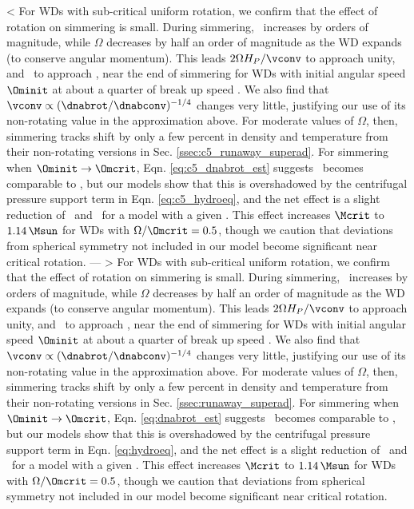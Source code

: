 < For WDs with sub-critical uniform rotation, we confirm that the effect of rotation on simmering is small.  During simmering, \vconv\ increases by orders of magnitude, while $\Omega$ decreases by half an order of magnitude as the WD expands (to conserve angular momentum).  This leads $2\Omega H_P/\vconv$ to approach unity, and \dnabrot\ to approach \dnabconv, near the end of simmering for WDs with initial angular speed $\Ominit$ at about a quarter of break up speed \Omcrit.  We also find that $\vconv \propto (\dnabrot/\dnabconv)^{-1/4}$ changes very little, justifying our use of its non-rotating value in the approximation above. For moderate values of $\Omega$, then, simmering tracks shift by only a few percent in density and temperature from their non-rotating versions in Sec. \ref{ssec:c5_runaway_superad}.  For simmering when $\Ominit \rightarrow \Omcrit$, Eqn. \ref{eq:c5_dnabrot_est} suggests \dnabrot\ becomes comparable to \nablaad, but our models show that this is overshadowed by the centrifugal pressure support term in Eqn. \ref{eq:c5_hydroeq}, and the net effect is a slight reduction of \rhoc\ and \Tc\ for a model with a given \Sc.  This effect increases $\Mcrit$ to $1.14\,\Msun$ for WDs with $\Omega/\Omcrit = 0.5$, though we caution that deviations from spherical symmetry not included in our model become significant near critical rotation.
---
> For WDs with sub-critical uniform rotation, we confirm that the effect of rotation on simmering is small.  During simmering, \vconv\ increases by orders of magnitude, while $\Omega$ decreases by half an order of magnitude as the WD expands (to conserve angular momentum).  This leads $2\Omega H_P/\vconv$ to approach unity, and \dnabrot\ to approach \dnabconv, near the end of simmering for WDs with initial angular speed $\Ominit$ at about a quarter of break up speed \Omcrit.  We also find that $\vconv \propto (\dnabrot/\dnabconv)^{-1/4}$ changes very little, justifying our use of its non-rotating value in the approximation above. For moderate values of $\Omega$, then, simmering tracks shift by only a few percent in density and temperature from their non-rotating versions in Sec. \ref{ssec:runaway_superad}.  For simmering when $\Ominit \rightarrow \Omcrit$, Eqn. \ref{eq:dnabrot_est} suggests \dnabrot\ becomes comparable to \nablaad, but our models show that this is overshadowed by the centrifugal pressure support term in Eqn. \ref{eq:hydroeq}, and the net effect is a slight reduction of \rhoc\ and \Tc\ for a model with a given \Sc.  This effect increases $\Mcrit$ to $1.14\,\Msun$ for WDs with $\Omega/\Omcrit = 0.5$, though we caution that deviations from spherical symmetry not included in our model become significant near critical rotation.
